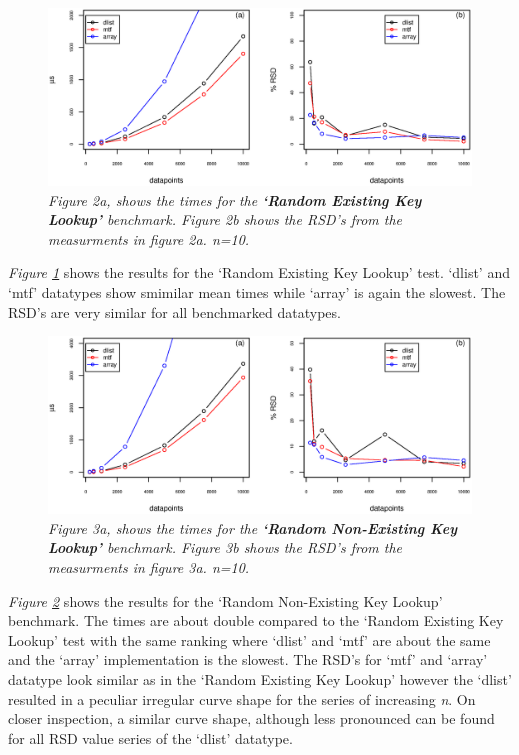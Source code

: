 \documentclass[a4paper,11pt,twoside]{article}
\begin{document}
\begin{figure}[H] 
\centering 
\includegraphics[width=\textwidth]{figures/fig2.eps}
\caption{\textit{Figure 2a, shows the times for the \textbf{`Random Existing
    Key Lookup'} benchmark. Figure 2b shows the RSD's from the measurments
in figure 2a. n=10.}}
\label{fig:randexlook}
\end{figure}

\textit{Figure \ref{fig:randexlook}} shows the results for the `Random
Existing Key Lookup' test. `dlist' and `mtf' datatypes show smimilar
mean times while `array' is again the slowest. The RSD's are very
similar for all benchmarked datatypes.

\begin{figure}[H] 
\centering 
\includegraphics[width=\textwidth]{figures/fig3.eps}
\caption{\textit{Figure 3a, shows the times for the \textbf{`Random
      Non-Existing Key Lookup'} benchmark. Figure 3b shows the RSD's from
    the measurments in figure 3a. n=10.}}
\label{fig:randnonexlook}
\end{figure}

\textit{Figure \ref{fig:randnonexlook}} shows the results for the
`Random Non-Existing Key Lookup' benchmark. The times are about double
compared to the `Random Existing Key Lookup' test with the same
ranking where `dlist' and `mtf' are about the same and the `array'
implementation is the slowest. The RSD's for `mtf' and `array'
datatype look similar as in the `Random Existing Key Lookup' however
the `dlist' resulted in a peculiar irregular curve shape for the
series of increasing \textit{n}. On closer inspection, a similar curve
shape, although less pronounced can be found for all RSD value series
of the `dlist' datatype.
\end{document}
